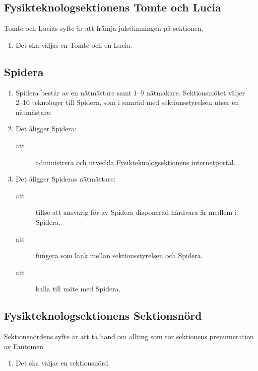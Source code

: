 \documentclass[11pt,a4paper]{article}
\begin{document}
\subsection{Fysikteknologsektionens Tomte och Lucia}
Tomte och Lucias syfte är att främja julstämningen på sektionen.
\begin{enumerate}[\thesubsection .1]

  \item Det ska väljas en Tomte och en Lucia.

\end{enumerate}

\subsection{Spidera}

\begin{enumerate}[\thesubsection .1]

  \item Spidera består av en nätmästare samt 1--9
  nätmakare. Sektionsmötet väljer 2--10 teknologer till
  Spidera, som i samråd med sektionsstyrelsen utser en nätmästare.

  \item Det åligger Spidera:
    \begin{description}
      \item[att] administrera och utveckla Fysikteknologsektionens internetportal.
    \end{description}

  \item Det åligger Spideras nätmästare:
    \begin{description}
      \item[att] tillse att ansvarig för av Spidera disponerad hårdvara är medlem i Spidera.
      \item[att] fungera som länk mellan sektionsstyrelsen och Spidera.
      \item[att] kalla till möte med Spidera.
    \end{description}


\end{enumerate}

\subsection{Fysikteknologsektionens Sektionsnörd}
Sektionsnördens syfte är att ta hand om allting som rör sektionens prenumeration av Fantomen
\begin{enumerate}[\thesubsection .1]

  \item Det ska väljas en sektionsnörd.

\end{enumerate}
\end{document}
